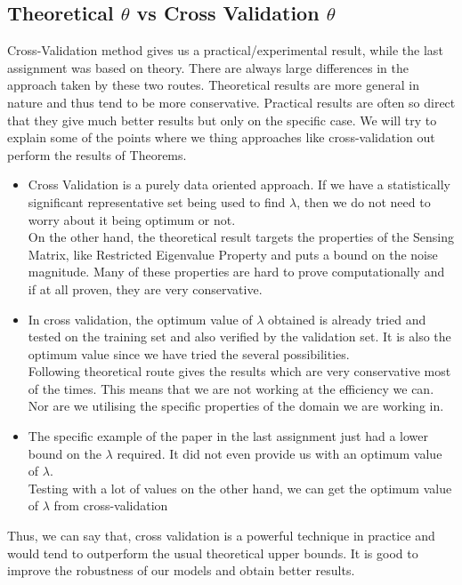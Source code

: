 \documentclass[a4paper,14pt]{article}
\numberwithin{definition}{section}
\numberwithin{mytheorem}{subsection}
\begin{document}
\subsection{Theoretical $\theta$ vs Cross Validation $\theta$}

Cross-Validation method gives us a practical/experimental result, while the last assignment was based on theory. There are always large differences in the approach taken by these two routes. Theoretical results are more general in nature and thus tend to be more conservative. Practical results are often so direct that they give much better results but only on the specific case. We will try to explain some of the points where we thing approaches like cross-validation out perform the results of Theorems.

\begin{itemize}
    \item Cross Validation is a purely data oriented approach.  If we have a statistically significant representative set being used to find $\lambda$, then we do not need to worry about it being optimum or not.\\
    On the other hand, the theoretical result targets the properties of the Sensing Matrix, like Restricted Eigenvalue Property and puts a bound on the noise magnitude. Many of these properties are hard to prove computationally and if at all proven, they are very conservative.
    \item In cross validation, the optimum value of $\lambda$ obtained is already tried and tested on the training set and also verified by the validation set. It is also the optimum value since we have tried the several possibilities.\\
    Following theoretical route gives the results which are very conservative most of the times. This means that we are not working at the efficiency we can. Nor are we utilising the specific properties of the domain we are working in.
    \item The specific example of the paper in the last assignment just had a lower bound on the $\lambda$ required. It did not even provide us with an optimum value of $\lambda$.\\
    Testing with a lot of values on the other hand, we can get the optimum value of $\lambda$ from cross-validation
\end{itemize}

Thus, we can say that, cross validation is a powerful technique in practice and would tend to outperform the usual theoretical upper bounds. It is good to improve the robustness of our models and obtain better results.
\end{document}
